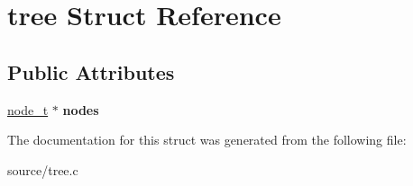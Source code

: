 \hypertarget{structtree}{}\section{tree Struct Reference}
\label{structtree}
\subsection*{Public Attributes}
\begin{DoxyCompactItemize}
\item 
\hyperlink{structtree__node}{node\+\_\+t} $\ast$ {\bfseries nodes}\hypertarget{structtree_adba9d81bc1781b6f5944fbea183881d0}{}\label{structtree_adba9d81bc1781b6f5944fbea183881d0}

\end{DoxyCompactItemize}


The documentation for this struct was generated from the following file\+:\begin{DoxyCompactItemize}
\item 
source/tree.\+c\end{DoxyCompactItemize}
